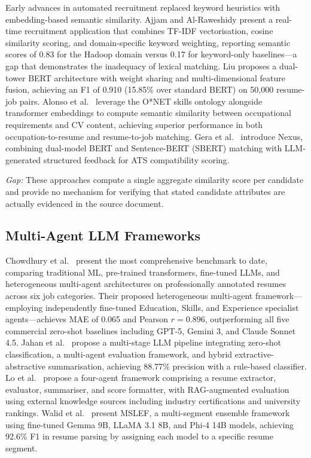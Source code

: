 \documentclass[journal]{IEEEtran}
\begin{document}
Early advances in automated recruitment replaced keyword heuristics with
embedding-based semantic similarity. Ajjam and Al-Raweshidy \cite{ajjam2026}
present a real-time recruitment application that combines TF-IDF vectorisation,
cosine similarity scoring, and domain-specific keyword weighting, reporting
semantic scores of 0.83 for the Hadoop domain versus 0.17 for keyword-only
baselines—a gap that demonstrates the inadequacy of lexical matching. Liu
\cite{liu2025} proposes a dual-tower BERT architecture with weight sharing and
multi-dimensional feature fusion, achieving an F1 of 0.910 (15.85\% over
standard BERT) on 50,000 resume-job pairs. Alonso et al.\ \cite{alonso2025}
leverage the O*NET skills ontology alongside transformer embeddings to compute
semantic similarity between occupational requirements and CV content, achieving
superior performance in both occupation-to-resume and resume-to-job matching.
Gera et al.\ \cite{gera2026} introduce Nexus, combining dual-model BERT and
Sentence-BERT (SBERT) matching with LLM-generated structured feedback for ATS
compatibility scoring.

\textit{Gap:} These approaches compute a single aggregate similarity score per
candidate and provide no mechanism for verifying that stated candidate attributes
are actually evidenced in the source document.

\subsection{Multi-Agent LLM Frameworks}

Chowdhury et al.\ \cite{chowdhury2026} present the most comprehensive benchmark
to date, comparing traditional ML, pre-trained transformers, fine-tuned LLMs, and
heterogeneous multi-agent architectures on professionally annotated resumes across
six job categories. Their proposed heterogeneous multi-agent framework—employing
independently fine-tuned Education, Skills, and Experience specialist
agents—achieves MAE of 0.065 and Pearson $r = 0.896$, outperforming all five
commercial zero-shot baselines including GPT-5, Gemini 3, and Claude Sonnet 4.5.
Jahan et al.\ \cite{jahan2026} propose a multi-stage LLM pipeline integrating
zero-shot classification, a multi-agent evaluation framework, and hybrid
extractive-abstractive summarisation, achieving 88.77\% precision with a
rule-based classifier. Lo et al.\ \cite{lo2025} propose a four-agent framework
comprising a resume extractor, evaluator, summariser, and score formatter, with
RAG-augmented evaluation using external knowledge sources including industry
certifications and university rankings. Walid et al.\ \cite{walid2025} present
MSLEF, a multi-segment ensemble framework using fine-tuned Gemma 9B, LLaMA 3.1
8B, and Phi-4 14B models, achieving 92.6\% F1 in resume parsing by assigning
each model to a specific resume segment.
\end{document}
